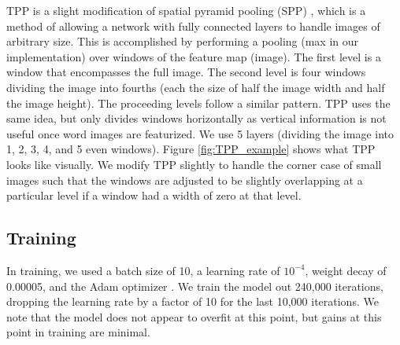 \documentclass[ms,electronic,twosidetoc,letterpaper,chaptercenter,parttop,lof,lot]{byumsphd}
\begin{document}
TPP is a slight modification of spatial pyramid pooling (SPP) \cite{SPP}, which is a method of allowing a network with fully connected layers to handle images of arbitrary size. This is accomplished by performing a pooling (max in our implementation) over windows of the feature map (image). The first level is a window that encompasses the full image. The second level is four windows dividing the image into fourths (each the size of half the image width and half the image height). The proceeding levels follow a similar pattern. TPP uses the same idea, but only divides windows horizontally as vertical information is not useful once word images are featurized. We use 5 layers (dividing the image into 1, 2, 3, 4, and 5 even windows). Figure \ref{fig:TPP_example} shows what TPP looks like visually. %
We modify TPP slightly to handle the corner case of small images such that the windows are adjusted to be slightly overlapping at a particular level if a window had a width of zero at that level.




\subsection{Training}

In training, we used a batch size of 10, a learning rate of $10^{-4}$, weight decay of 0.00005, and the Adam optimizer \cite{adam}.
We train the model out 240,000 iterations, dropping the learning rate by a factor of 10 for the last 10,000 iterations. We note that the model does not appear to overfit at this point, but gains at this point in training are minimal.
\end{document}
